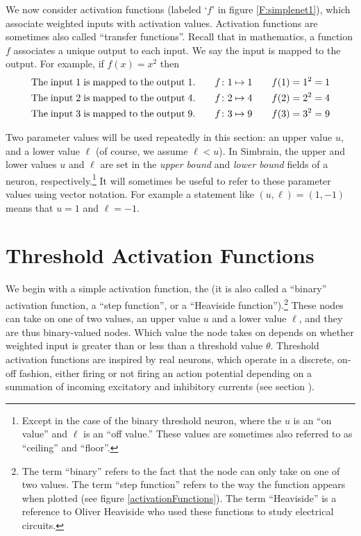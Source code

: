 We now consider activation functions (labeled `$f$' in figure
\ref{F:simplenet1}), which associate weighted inputs with activation
values. Activation functions are sometimes also called ``transfer functions''. Recall
that in mathematics, a function $f$ associates a unique output to each input.
We say the input is mapped to the output. For example, if $f(x) = x^2$
then
\begin{eqnarray*}
{\rm The\; input\; 1\; is\; mapped\; to\; the\; output\; 1}.
\qquad f\colon 1 \mapsto 1
\qquad f(1)=1^2 = 1 \\
{\rm The\; input\; 2\; is\; mapped\; to\; the\; output\; 4}.
\qquad f\colon 2 \mapsto 4
\qquad f(2)=2^2 = 4 \\
{\rm The\; input\; 3\; is\; mapped\; to\; the\; output\; 9}.
\qquad f\colon 3 \mapsto 9
\qquad f(3)=3^2 = 9
\end{eqnarray*}

   Two parameter values will be used repeatedly in this section: an upper value
$u$, and a lower value $\ell$ (of course, we assume $\ell < u$). In Simbrain, the upper and lower values $u$ and
$\ell$ are set in the \emph{upper bound} and \emph{lower bound} fields of a neuron, respectively.\footnote{Except in the case of the binary threshold neuron, where the $u$ is an ``on value'' and $\ell$ is an ``off value.''  These values are sometimes also referred to as ``ceiling'' and ``floor''.}  It will sometimes be useful to refer to these parameter values using vector notation. For example a statement like $(u,\ell) = (1,-1)$ means that $u = 1$ and $\ell = -1$.

\section{Threshold Activation Functions}

   We begin with a simple activation function, the  (it is also called a ``binary'' activation function, a ``step function'', or a
``Heaviside function'').\footnote{The term ``binary'' refers to the fact that the
node can only take on one of two values. The term ``step function'' refers to the way the function appears when plotted (see figure \ref{activationFunctions}). The term ``Heaviside'' is a reference to Oliver Heaviside  who used these functions to study electrical circuits.}  These nodes can take on one of two values, an upper
value $u$ and a lower value $\ell$, and they are thus binary-valued nodes.
Which value the node takes on depends on whether weighted input is greater than
or less than a threshold value $\theta$. Threshold
activation functions are inspired by real neurons, which operate in a
discrete, on-off fashion, either firing or not firing an action potential
depending on a summation of incoming excitatory and inhibitory currents (see section ).

